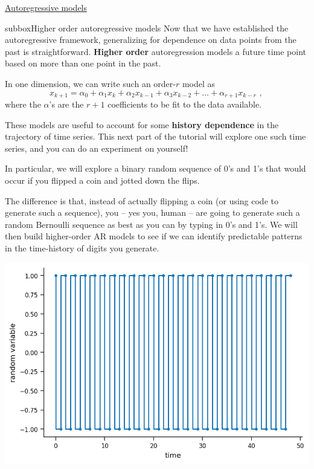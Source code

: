 \begin{textbox}{\href{https://compneuro.neuromatch.io/tutorials/W2D2_LinearSystems/student/W2D2_Tutorial4.html}{Autoregressive models } }
\begin{subbox}{subbox}{Higher order autoregressive models}
\scriptsize
Now that we have established the autoregressive framework, generalizing for dependence on data points from the past is straightforward. \textbf{Higher order} autoregression models a future time point based on more than one point in the past.

In one dimension, we can write such an order-$r$ model as
$$
x_{k+1} = \alpha_0 + \alpha_1 x_k + \alpha_2 x_{k-1} + \alpha_3 x_{k-2} + \dots + \alpha_{r+1} x_{k-r} \text{  , }
$$
where the $\alpha$'s are the $r+1$ coefficients to be fit to the data available.

These models are useful to account for some \textbf{history dependence} in the trajectory of time series. This next part of the tutorial will explore one such time series, and you can do an experiment on yourself!

In particular, we will explore a binary random sequence of 0's and 1's that would occur if you flipped a coin and jotted down the flips. 

The difference is that, instead of actually flipping a coin (or using code to generate such a sequence), you -- yes you, human -- are going to generate such a random Bernoulli sequence as best as you can by typing in 0's and 1's. We will then build higher-order AR models to see if we can identify predictable patterns in the time-history of digits you generate.
\begin{center}
\includegraphics[scale=0.4]{Figures/LS/CDS_Figure11.png}
\end{center}

\end{subbox}

\end{textbox}

